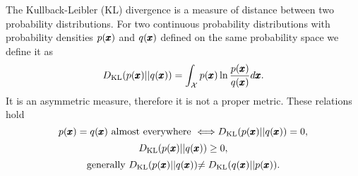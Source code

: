 The Kullback-Leibler (KL) divergence is a measure of distance between two probability distributions. For two continuous probability distributions with probability densities $p(\pmb{{x}})$ and $q(\pmb{{x}})$ defined on the same probability space we define it as
\begin{equation}
D_{\text{KL}}\left(p(\vc{x})||q(\vc{x})\right)=\int_{\mathcal{X}}p(\vc{x})\ln\frac{p(\vc{x})}{q(\vc{x})}d\vc{x}.\label{eq:kld}
\end{equation}
It is an asymmetric measure, therefore it is not a proper metric. These relations hold
\begin{equation}
p(\vc{x})=q(\vc{x})\text{ almost everywhere }\Longleftrightarrow D_{\text{KL}}\left(p(\vc{x})||q(\vc{x})\right)=0,
\end{equation}
\begin{equation}
D_{\text{KL}}\left(p(\vc{x})||q(\vc{x})\right)\geq0,
\end{equation}
\begin{equation}
\text{\text{generally} \ensuremath{D_{\text{KL}}\left(p(\vc{x})||q(\vc{x})\right)}\ensuremath{\ensuremath{\neq D_{\text{KL}}\left(q(\vc{x})||p(\vc{x})\right)}}.}
\end{equation}


